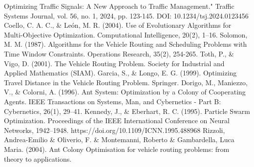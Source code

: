 \newline[13]Optimizing Traffic Signals: A New Approach to Traffic Management." Traffic Systems Journal, vol. 56, no. 1, 2024, pp. 123-145. DOI: 10.1234/tsj.2024.0123456
\newline[14]Coello, C. A. C., \& León, M. R. (2004). Use of Evolutionary Algorithms for Multi-Objective Optimization. Computational Intelligence, 20(2), 1–16.
\newline[15]Solomon, M. M. (1987). Algorithms for the Vehicle Routing and Scheduling Problems with Time Window Constraints. Operations Research, 35(2), 254-265.
\newline[16]Toth, P., \& Vigo, D. (2001). The Vehicle Routing Problem. Society for Industrial and Applied Mathematics (SIAM).
\newline[17]Garcia, S., \& Longo, E. G. (1999). Optimizing Travel Distance in the Vehicle Routing Problem. Springer.
\newline[18]Dorigo, M., Maniezzo, V., \& Colorni, A. (1996). Ant System: Optimization by a Colony of Cooperating Agents. IEEE Transactions on Systems, Man, and Cybernetics - Part B: Cybernetics, 26(1), 29–41.
\newline[19]Kennedy, J., \& Eberhart, R. C. (1995). Particle Swarm Optimization. Proceedings of the IEEE International Conference on Neural Networks, 1942–1948. https://doi.org/10.1109/ICNN.1995.488968
\newline[20] Rizzoli, Andrea-Emilio \& Oliverio, F. \& Montemanni, Roberto \& Gambardella, Luca Maria. (2004). Ant Colony Optimisation for vehicle routing problems: from theory to applications. 

